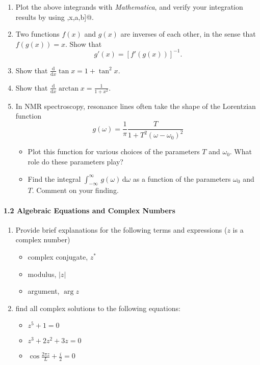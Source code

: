 \documentclass{chem6155problemset}
\begin{document}
\begin{enumerate}
	 \item Plot the above integrands with \emph{Mathematica}, and verify your integration
	 results by using \newline \verb@Integrate[f[x],{x,a,b}]@.
	 
	 \item Two functions $f(x)$ and $g(x)$ are inverses of each other, in the sense that
	 $f(g(x))=x$. Show that 
	 \[ g'(x) = [f'(g(x))]^{-1}. \]
	 
	 \item Show that $\displaystyle\frac{\mathrm{d}}{\mathrm d x} \tan x = 1+\tan^2 x.$
	 
	 \item Show that $\displaystyle\frac{\mathrm{d}}{\mathrm d x} \arctan x = \frac{1}{1+x^2}$.
	 
	 \item In NMR spectroscopy, resonance lines often take the shape of the Lorentzian function
	 \[\displaystyle g(\omega) = \frac{1}{\pi} \frac{T}{1+T^2(\omega-\omega_0)^2}\]
	 \begin{itemize}
	  \item Plot this function for various choices of the parameters $T$ and $\omega_0$. What
	 	role do these parameters play? 
	  \item Find the integral $\int_{-\infty}^\infty\,g(\omega)\,\mathrm{d}\omega$ as a 
	  function of the parameters $\omega_0$ and $T$. Comment on your finding.
	  \end{itemize}
\end{enumerate}

\paragraph{1.2 Algebraic Equations and Complex Numbers}

\begin{enumerate}[resume]
	\item Provide brief explanations for the following terms and expressions ($z$ is a complex number)
	\begin{itemize}
		\item complex conjugate, $z^\ast$
		\item modulus, $|z|$
		\item argument, $\arg z$
	\end{itemize}
	
	\item find all complex solutions to the following equations:
	\begin{itemize}
	 	\item $z^5 + 1 = 0$
		\item $z^3+2z^2+3z = 0$
		\item $\cos\frac{2\pi z}{L} + \frac{i}{2} =0$
	\end{itemize}
\end{enumerate}
\end{document}
